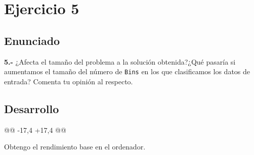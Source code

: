 \section{Ejercicio 5}
\subsection{Enunciado}
\begin{ejer}
    \textbf{5.-} ¿Afecta el tamaño del problema a la solución obtenida?¿Qué pasaría si aumentamos el tamaño
    del número de \texttt{Bins} en los que clasificamos los datos de entrada? Comenta tu opinión al respecto.
\end{ejer}
\subsection{Desarrollo}
\begin{listing}[firstnumber=16]
    @@ -17,4 +17,4 @@

\end{listing}
\par Obtengo el rendimiento base en el ordenador.
\begin{listing}[style=consola]

\end{listing}
